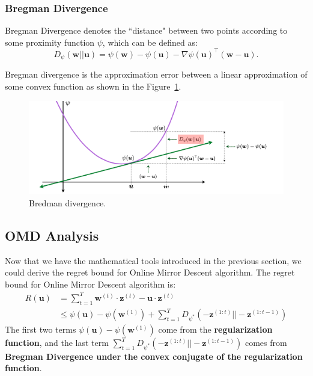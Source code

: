 \documentclass[11pt]{article}
\newcommand{\bw}{\boldsymbol{w}}
\newcommand{\bu}{\boldsymbol{u}}
\begin{document}
\subsubsection{Bregman Divergence}

Bregman Divergence denotes the ``distance" between two points according to some proximity function $\psi$, which can be defined as:
$$D_{\psi} (\bw||\bu) = \psi(\bw) - \psi(\bu) - \nabla \psi(\bu)^{\top} (\bw-\bu).$$

Bregman divergence is the approximation error between a linear approximation of some convex function as shown in the Figure~\ref{fig:breg55}.
\begin{figure}[H]
\begin{center}
\includegraphics[width=0.7\linewidth]{Img/bredman.png}
\end{center}
\vspace{-5mm}
 \caption{Bredman divergence.}
\label{fig:breg55}
\end{figure}

\subsection{OMD Analysis}

Now that we have the mathematical tools introduced in the previous section, we could derive the regret bound for Online Mirror Descent algorithm. The regret bound for Online Mirror Descent algorithm is:
\begin{equation*}
\begin{split}
R(\boldsymbol{u}) &= \sum_{t=1}^{T} \boldsymbol{w}^{(t)} \cdot \boldsymbol{z}^{(t)} - \boldsymbol{u} \cdot \boldsymbol{z}^{(t)} \\
& \leq \psi(\boldsymbol{u}) - \psi(\boldsymbol{w}^{(1)}) + \sum_{t=1}^{T} D_{\psi^*} (-\boldsymbol{z}^{(1:t)} || -\boldsymbol{z}^{(1:t-1)})
\end{split}
\end{equation*}
The first two terms $\psi(\boldsymbol{u}) - \psi(\boldsymbol{w}^{(1)})$ come from the \textbf{regularization function}, and the last term $\sum_{t=1}^{T} D_{\psi^*} (-\boldsymbol{z}^{(1:t)} || -\boldsymbol{z}^{(1:t-1)})$ comes from \textbf{Bregman Divergence under the convex conjugate of the regularization function}.
\end{document}
